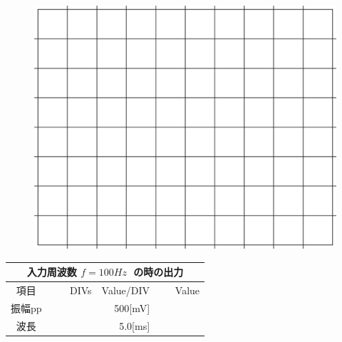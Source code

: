 \documentclass[uplatex,a4paper,11pt,oneside,openany]{jsbook}
\begin{document}
\begin{multicols}{2}
  \begin{figure}[H]
     \centering
      \includegraphics[keepaspectratio, scale=0.28, angle=0]
                  {figs/eps/grid.eps}
                  \label{fig:grid50mV}
  \end{figure}

  \begin{spacing}{1.5}
  \begin{tabular}{|c||r|r|r|}
    \multicolumn{4}{c}{入力周波数 $f=100Hz\;$ の時の出力} \\ \hline
    項目 & DIVs & Value/DIV & Value \\ \hline \hline
    振幅pp & 　　　　 & 500[mV]& 　　　　 \\ \hline
    波長 & 　　　　 & 5.0[ms]& 　　　　 \\ \hline
  \end{tabular}
\end{spacing}
\end{multicols}

\vfill

\newpage
\end{document}
